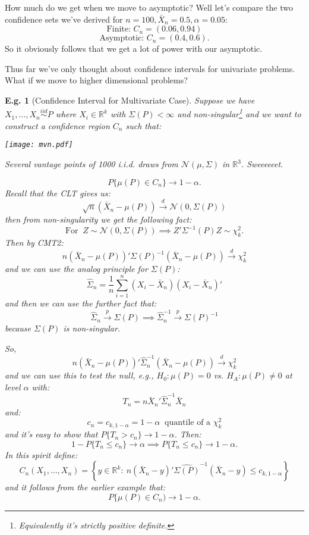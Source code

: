 \documentclass{tufte-book}
\theoremstyle{mytheoremstyle}
\theoremstyle{mylemstyle}
\theoremstyle{mydefstyle}
\newtheorem*{ex}{E.g.}
\begin{document}
How much do we get when we move to asymptotic? Well let's compare the two confidence sets we've derived for \(n = 100, \bar{X}_n = 0.5, \alpha = 0.05\):
	\[\text{Finite: } C_n = (0.06, 0.94)\]
	\[\text{Asymptotic: } C_n = (0.4, 0.6)\text{.}\]
So it obviously follows that we get a lot of power with our asymptotic. 


Thus far we've only thought about confidence intervals for univariate problems. What if we move to higher dimensional problems? 
\begin{ex}[Confidence Interval for Multivariate Case] Suppose we have \(X_1, \dots, X_n \overset{iid}{\sim} P\) where \(X_i \in \mathbb{R}^k\) with \(\Sigma(P) < \infty\) and non-singular\footnote[][-1in]{Equivalently it's strictly positive definite.} and we want to construct a confidence region \(C_n\) such that: 
\begin{marginfigure} \texttt{[image: mvn.pdf]} \caption{Several vantage points of 1000 i.i.d. draws from \(\mathcal{N}(\mu, \Sigma)\) in \(\mathbb{R}^3\). Sweeeeeet.} \end{marginfigure}
	\[P\{\mu(P) \in C_n\} \rightarrow 1 - \alpha \text{.}\]
Recall that the CLT gives us:
	\[\sqrt{n}(\bar{X}_n - \mu(P)) \overset{d}{\rightarrow} \mathcal{N}(0, \Sigma(P))\]
then from non-singularity we get the following fact:
	\[\text{For }\ Z \sim \mathcal{N}(0, \Sigma(P)) \implies Z'\Sigma^{-1}(P)Z \sim \chi_k^2 \text{.}\]
Then by CMT2:
	\[n(\bar{X}_n - \mu(P))'\Sigma(P)^{-1}(\bar{X}_n - \mu(P)) \overset{d}{\rightarrow} \chi_k^2\]
and we can use the analog principle for \(\Sigma(P)\):
	\[\hat{\Sigma}_n = \frac{1}{n} \sum_{i = 1}^n (X_i - \bar{X}_n)(X_i - \bar{X}_n)'\]
and then we can use the further fact that:
	\[\hat{\Sigma}_n \overset{p}{\rightarrow} \Sigma(P) \implies \hat{\Sigma}_n^{-1} \overset{p}{\rightarrow} \Sigma(P)^{-1}\]
because \(\Sigma(P)\) is non-singular. 

So,
	\[n(\bar{X}_n - \mu(P))'\hat{\Sigma}_n^{-1}(\bar{X}_n - \mu(P)) \overset{d}{\rightarrow} \chi_k^2\]
and we can use this to test the null, e.g., \(H_0: \mu(P) = 0\) vs. \(H_A: \mu(P) \ne 0\) at level \(\alpha\) with:
	\[T_n = n \bar{X}_n' \hat{\Sigma}_n^{-1} \bar{X}_n\]
and:
	\[c_n = c_{k, 1-\alpha} = 1-\alpha\ \text{ quantile of a } \chi_k^2\]
and it's easy to show that \(P\{T_n > c_n\} \rightarrow 1-\alpha\). Then:
	\[1 - P\{T_n \le c_n\} \rightarrow \alpha \implies P\{T_n \le c_n\} \rightarrow 1 - \alpha \text{.}\]
In this spirit define:
	\[C_n(X_1, \dots, X_n) = \left\{y \in \mathbb{R}^k:\ n(\bar{X}_n - y)'\hat{\Sigma(P)}^{-1}(\bar{X}_n - y) \le c_{k, 1-\alpha}\right\}\]
and it follows from the earlier example that:
	\[P\{\mu(P) \in C_n) \rightarrow 1-\alpha \text{.}\]
\end{ex}	
\end{document}
